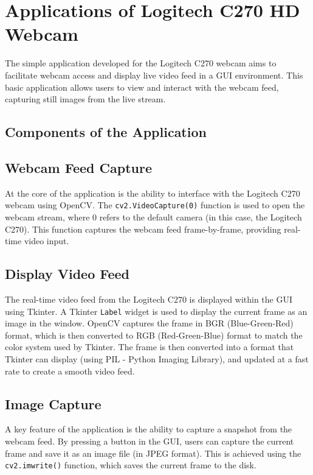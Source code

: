 \section{Applications of Logitech C270 HD Webcam}
The simple application developed for the Logitech C270 webcam aims to facilitate webcam access and display live video feed in a GUI environment. This basic application allows users to view and interact with the webcam feed, capturing still images from the live stream.

\subsection{Components of the Application}

\subsection*{Webcam Feed Capture}
At the core of the application is the ability to interface with the Logitech C270 webcam using OpenCV. The \texttt{cv2.VideoCapture(0)} function is used to open the webcam stream, where 0 refers to the default camera (in this case, the Logitech C270). This function captures the webcam feed frame-by-frame, providing real-time video input.

\subsection*{Display Video Feed}
The real-time video feed from the Logitech C270 is displayed within the GUI using Tkinter. A Tkinter \texttt{Label} widget is used to display the current frame as an image in the window. OpenCV captures the frame in BGR (Blue-Green-Red) format, which is then converted to RGB (Red-Green-Blue) format to match the color system used by Tkinter. The frame is then converted into a format that Tkinter can display (using PIL - Python Imaging Library), and updated at a fast rate to create a smooth video feed.

\subsection*{Image Capture}
A key feature of the application is the ability to capture a snapshot from the webcam feed. By pressing a button in the GUI, users can capture the current frame and save it as an image file (in JPEG format). This is achieved using the \texttt{cv2.imwrite()} function, which saves the current frame to the disk.

